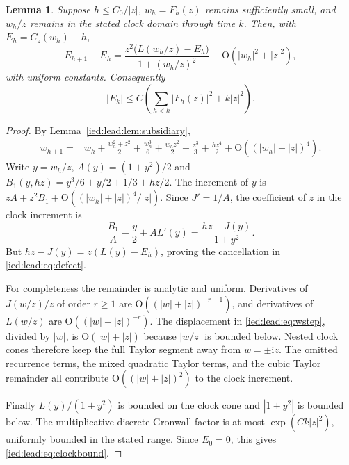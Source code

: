 \documentclass[11pt,letterpaper]{article}
\newtheorem{lemma}[theorem]{Lemma}
\theoremstyle{remark}\newtheorem{remark}[theorem]{Remark}
\newcommand{\ii}{\mathrm i}\newcommand{\dd}{\,\mathrm d}
\newcommand{\Oh}{\mathrm O}\newcommand{\supp}{\operatorname{supp}}
\begin{document}
\begin{lemma}\label{ied:lead:lem:clock}
Suppose $h\le C_0/|z|$, $w_h=F_h(z)$ remains sufficiently small, and $w_h/z$ remains in the stated clock domain through time $k$. Then, with $E_h=C_z(w_h)-h$,
\begin{equation}\label{ied:lead:eq:defect}
 E_{h+1}-E_h
 =\frac{z^2\bigl(L(w_h/z)-E_h\bigr)}{1+(w_h/z)^2}
   +\Oh(|w_h|^2+|z|^2),
\end{equation}
with uniform constants. Consequently
\begin{equation}\label{ied:lead:eq:clockbound}
 |E_k|\le C\left(\sum_{h<k}|F_h(z)|^2+k|z|^2\right).
\end{equation}
\end{lemma}
\begin{proof}
By Lemma~\ref{ied:lead:lem:subsidiary},
\begin{align}\label{ied:lead:eq:wstep}
 w_{h+1}={}&w_h+\frac{w_h^2+z^2}2+\frac{w_h^3}6
 +\frac{w_hz^2}2+\frac{z^3}3+\frac{hz^4}2
 +\Oh((|w_h|+|z|)^4).
\end{align}
Write $y=w_h/z$, $A(y)=(1+y^2)/2$ and
$B_1(y,hz)=y^3/6+y/2+1/3+hz/2$. The increment of $y$ is
$zA+z^2B_1+\Oh((|w_h|+|z|)^4/|z|)$. Since $J'=1/A$, the coefficient of $z$ in the clock increment is
\[
 \frac{B_1}{A}-\frac y2+A L'(y)=\frac{hz-J(y)}{1+y^2}.
\]
But $hz-J(y)=z(L(y)-E_h)$, proving the cancellation in \eqref{ied:lead:eq:defect}.

For completeness the remainder is analytic and uniform. Derivatives of $J(w/z)/z$ of order $r\ge1$ are $\Oh((|w|+|z|)^{-r-1})$, and derivatives of $L(w/z)$ are $\Oh((|w|+|z|)^{-r})$. The displacement in \eqref{ied:lead:eq:wstep}, divided by $|w|$, is $\Oh(|w|+|z|)$ because $|w/z|$ is bounded below. Nested clock cones therefore keep the full Taylor segment away from $w=\pm\ii z$. The omitted recurrence terms, the mixed quadratic Taylor terms, and the cubic Taylor remainder all contribute $\Oh((|w|+|z|)^2)$ to the clock increment.

Finally $L(y)/(1+y^2)$ is bounded on the clock cone and $|1+y^2|$ is bounded below. The multiplicative discrete Gronwall factor is at most $\exp(Ck|z|^2)$, uniformly bounded in the stated range. Since $E_0=0$, this gives \eqref{ied:lead:eq:clockbound}.
\end{proof}
\end{document}
